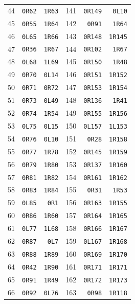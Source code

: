 \begin{longtable}{@{}rrr@{\hspace{20pt}}rrr@{}}
44 & \texttt{0R62} & \texttt{1R63} & 141 & \texttt{0R149} & \texttt{0L10}\\
45 & \texttt{0R55} & \texttt{1R64} & 142 & \texttt{0R91} & \texttt{1R64}\\
46 & \texttt{0L65} & \texttt{1R66} & 143 & \texttt{0R148} & \texttt{1R145}\\
47 & \texttt{0R36} & \texttt{1R67} & 144 & \texttt{0R102} & \texttt{1R67}\\
48 & \texttt{0L68} & \texttt{1L69} & 145 & \texttt{0R150} & \texttt{1R48}\\
49 & \texttt{0R70} & \texttt{0L14} & 146 & \texttt{0R151} & \texttt{1R152}\\
50 & \texttt{0R71} & \texttt{0R72} & 147 & \texttt{0R153} & \texttt{1R154}\\
51 & \texttt{0R73} & \texttt{0L49} & 148 & \texttt{0R136} & \texttt{1R41}\\
52 & \texttt{0R74} & \texttt{1R54} & 149 & \texttt{0R155} & \texttt{1R156}\\
53 & \texttt{0L75} & \texttt{0L15} & 150 & \texttt{0L157} & \texttt{1L153}\\
54 & \texttt{0R76} & \texttt{0L10} & 151 & \texttt{0R28} & \texttt{1R158}\\
55 & \texttt{0R77} & \texttt{1R78} & 152 & \texttt{0R145} & \texttt{1R159}\\
56 & \texttt{0R79} & \texttt{1R80} & 153 & \texttt{0R137} & \texttt{1R160}\\
57 & \texttt{0R81} & \texttt{1R82} & 154 & \texttt{0R161} & \texttt{1R162}\\
58 & \texttt{0R83} & \texttt{1R84} & 155 & \texttt{0R31} & \texttt{1R53}\\
59 & \texttt{0L85} & \texttt{0R1} & 156 & \texttt{0R163} & \texttt{1R155}\\
60 & \texttt{0R86} & \texttt{1R60} & 157 & \texttt{0R164} & \texttt{1R165}\\
61 & \texttt{0L77} & \texttt{1L68} & 158 & \texttt{0R166} & \texttt{1R167}\\
62 & \texttt{0R87} & \texttt{0L7} & 159 & \texttt{0L167} & \texttt{1R168}\\
63 & \texttt{0R88} & \texttt{1R89} & 160 & \texttt{0R169} & \texttt{1R170}\\
64 & \texttt{0R42} & \texttt{1R90} & 161 & \texttt{0R171} & \texttt{1R171}\\
65 & \texttt{0R91} & \texttt{1R49} & 162 & \texttt{0R172} & \texttt{1R173}\\
66 & \texttt{0R92} & \texttt{0L76} & 163 & \texttt{0R98} & \texttt{1R118}\\

\end{longtable}
